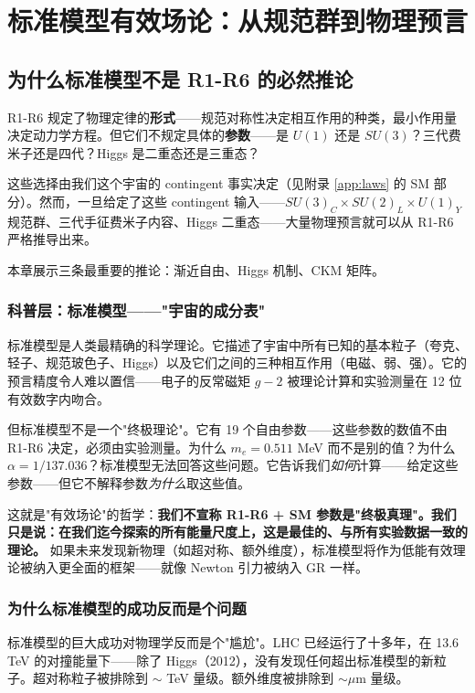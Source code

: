 \chapter{标准模型有效场论：从规范群到物理预言}
\label{ch:sm-eft}

\section*{为什么标准模型不是 R1-R6 的必然推论}

R1-R6 规定了物理定律的\textbf{形式}——规范对称性决定相互作用的种类，最小作用量决定动力学方程。但它们不规定具体的\textbf{参数}——是 $U(1)$ 还是 $SU(3)$？三代费米子还是四代？Higgs 是二重态还是三重态？

这些选择由我们这个宇宙的 contingent 事实决定（见附录 \ref{app:laws} 的 SM 部分）。然而，一旦给定了这些 contingent 输入——$SU(3)_C\times SU(2)_L\times U(1)_Y$ 规范群、三代手征费米子内容、Higgs 二重态——大量物理预言就可以从 R1-R6 严格推导出来。

本章展示三条最重要的推论：渐近自由、Higgs 机制、CKM 矩阵。

\subsection{科普层：标准模型——"宇宙的成分表"}

标准模型是人类最精确的科学理论。它描述了宇宙中所有已知的基本粒子（夸克、轻子、规范玻色子、Higgs）以及它们之间的三种相互作用（电磁、弱、强）。它的预言精度令人难以置信——电子的反常磁矩 $g-2$ 被理论计算和实验测量在 12 位有效数字内吻合。

但标准模型不是一个"终极理论"。它有 19 个自由参数——这些参数的数值不由 R1-R6 决定，必须由实验测量。为什么 $m_e = 0.511$ MeV 而不是别的值？为什么 $\alpha = 1/137.036$？标准模型无法回答这些问题。它告诉我们\textit{如何}计算——给定这些参数——但它不解释参数\textit{为什么}取这些值。

这就是"有效场论"的哲学：\textbf{我们不宣称 R1-R6 + SM 参数是"终极真理"。我们只是说：在我们迄今探索的所有能量尺度上，这是最佳的、与所有实验数据一致的理论。} 如果未来发现新物理（如超对称、额外维度），标准模型将作为低能有效理论被纳入更全面的框架——就像 Newton 引力被纳入 GR 一样。

\subsection{为什么标准模型的成功反而是个问题}

标准模型的巨大成功对物理学反而是个"尴尬"。LHC 已经运行了十多年，在 13.6 TeV 的对撞能量下——除了 Higgs（2012），没有发现任何超出标准模型的新粒子。超对称粒子被排除到 $\sim$ TeV 量级。额外维度被排除到 $\sim \mu$m 量级。


